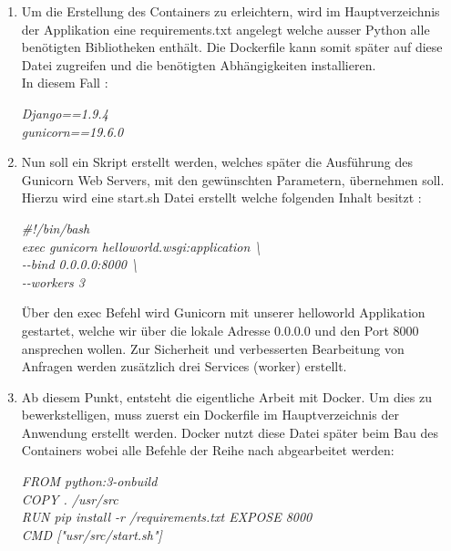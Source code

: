 \documentclass[12pt,toc=bib,toc=listof]{scrreprt}
\begin{document}
\begin{enumerate}[leftmargin=*]
	
\item Um die Erstellung des Containers zu erleichtern, wird im Hauptverzeichnis der Applikation eine requirements.txt angelegt welche ausser Python alle benötigten Bibliotheken enthält. Die Dockerfile kann somit später auf diese Datei zugreifen und die benötigten Abhängigkeiten installieren. \\
In diesem Fall :

\noindent\hspace*{25pt}\textit{Django==1.9.4}\\
\noindent\hspace*{25pt}\textit{gunicorn==19.6.0}

\item Nun soll ein Skript erstellt werden, welches später die Ausführung des Gunicorn Web Servers, mit den gewünschten Parametern, übernehmen soll.
Hierzu wird eine start.sh Datei erstellt welche folgenden Inhalt besitzt :


\noindent\hspace*{25pt}\textit{ \#!/bin/bash\\
\noindent\hspace*{25pt}	exec gunicorn helloworld.wsgi:application \textbackslash \\
\noindent\hspace*{25pt}	-{}-bind 0.0.0.0:8000 \textbackslash \\
\noindent\hspace*{25pt}	-{}-workers 3 }

Über den exec Befehl wird  Gunicorn mit unserer helloworld Applikation gestartet, welche wir über die lokale Adresse 0.0.0.0 und den Port 8000 ansprechen wollen. Zur Sicherheit und verbesserten Bearbeitung von Anfragen werden zusätzlich drei Services (worker) erstellt.

\item Ab diesem Punkt, entsteht die eigentliche Arbeit mit Docker. 
Um dies zu bewerkstelligen, muss zuerst ein Dockerfile im Hauptverzeichnis der Anwendung erstellt werden.
Docker nutzt diese Datei später beim Bau des Containers wobei alle Befehle der Reihe nach abgearbeitet werden:

\noindent\hspace*{25pt}\textit{FROM python:3-onbuild\\
\noindent\hspace*{25pt}COPY . /usr/src\\
\noindent\hspace*{25pt}RUN pip install -r /requirements.txt
\noindent\hspace*{25pt}EXPOSE 8000\\
\noindent\hspace*{25pt}CMD ["usr/src/start.sh"]}


\end{enumerate}
\end{document}
